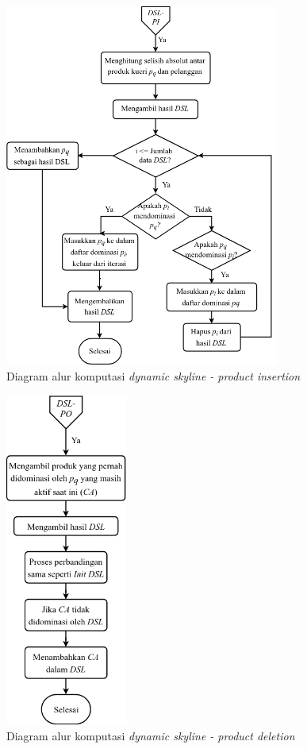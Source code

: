 \begin{figure}[H]
	\centering
	\includegraphics[width=9cm]{assets/img/bab3/flowchart-dsl-pi.png}
	\caption{Diagram alur komputasi \textit{dynamic skyline - product  insertion}}
	\label{fig:flowchart-dsl-pi}
\end{figure}

\begin{figure}[H]
	\centering
	\includegraphics[width=4cm]{assets/img/bab3/flowchart-dsl-pd.png}
	\caption{Diagram alur komputasi \textit{dynamic skyline - product deletion}}
	\label{fig:flowchart-dsl-pd}
\end{figure}

